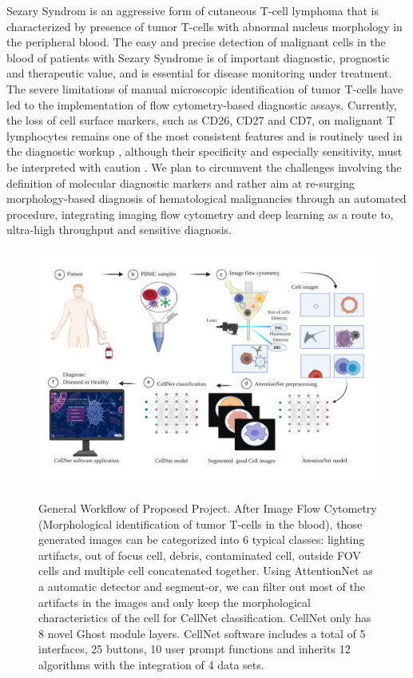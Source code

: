Sezary Syndrom is an aggressive form of cutaneous T-cell lymphoma that is characterized by presence of tumor T-cells with abnormal nucleus morphology in the peripheral blood. The easy and precise detection of malignant cells in the blood of patients with Sezary Syndrome is of important diagnostic, prognostic and therapeutic value, and is essential for disease monitoring under treatment\cite{b6}\cite{b7}. The severe limitations of manual microscopic identification of tumor T-cells have led to the implementation of flow cytometry-based diagnostic assays. Currently, the loss of cell surface markers, such as CD26, CD27 and CD7, on malignant T lymphocytes remains one of the most consistent features and is routinely used in the diagnostic workup \cite{b12}, although their specificity and especially sensitivity, must be interpreted with caution \cite{b11}. We plan to circumvent the challenges involving the definition of molecular diagnostic markers and rather aim at re-surging morphology-based diagnosis of hematological malignancies through an automated procedure, integrating imaging flow cytometry and deep learning as a route to, ultra-high throughput and sensitive diagnosis.
 
\label{sub:figures}
\begin{figure}[ht]
	\begin{center}
	\includegraphics[width=\textwidth]{thesis-template-master/images/general workflow2.pdf}
	\label{fig:lenna}
	\end{center}
	\caption{General Workflow of Proposed Project. After Image Flow Cytometry (Morphological identification of tumor T-cells in the blood), those generated images can be categorized into 6 typical classes: lighting artifacts, out of focus cell, debris, contaminated cell, outside FOV cells  and multiple cell concatenated together. Using AttentionNet as a automatic detector and segment-or, we can filter out most of the artifacts in the images and only keep the morphological characteristics of the cell for CellNet classification. CellNet only has 8 novel Ghost module layers. CellNet software includes a total of 5 interfaces, 25 buttons, 10 user prompt functions and inherits 12 algorithms with the integration of 4 data sets.}
	\label{fig:lennas}
\end{figure}



